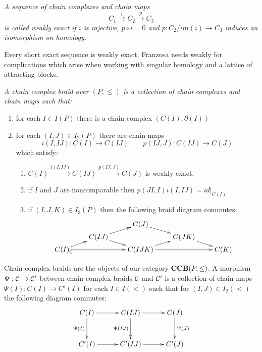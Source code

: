 \begin{defn}
{\em
A sequence of chain complexes and chain maps $$C_1\xrightarrow{i} C_2 \xrightarrow{p} C_3$$
is called {\em weakly exact} if $i$ is injective, $p\circ i = 0$ and $p:C_2/im(i)\to C_3$ induces an isomorphism on homology.
}
\end{defn}
\begin{rem}
Every short exact sequence is weakly exact.  Franzosa needs weakly for complications which arise when working with singular homology and a lattice of attracting blocks.
\end{rem}

\begin{defn}
{\em
A {\em chain complex braid} over $(P,\leq)$ is a collection of chain complexes and chain maps such that:
\begin{enumerate}
\item for each $I\in I(P)$ there is a chain complex $(C(I),\partial(I))$
\item for each $(I,J)\in I_2(P)$ there are chain maps $$i(I,IJ):C(I)\to C(IJ)\quad\quad p(IJ,J):C(IJ)\to C(J)$$ which satisfy:
\begin{enumerate}
\item $C(I)\xrightarrow{i(I,IJ)} C(IJ)\xrightarrow{p(IJ,J)} C(J)$ is weakly exact,
\item if $I$ and $J$ are noncomparable then $p(JI,I)i(I,IJ)=id|_{C(I)}$
\item if $(I,J,K)\in I_3(P)$ then the following braid diagram commutes:
\[
\xymatrixrowsep{0.03in}
\xymatrixcolsep{0.3in}
\xymatrix{
& & C(J) \ar[dr] & &  \\
& C(IJ) \ar[ur] \ar[dr] & & C(JK) \ar[dr] &  \\
C(I) \ar[ur] \ar@{_{(}->}[rr]& & C(IJK) \ar[rr] \ar[ur]& & C(K) 
}
\]
\end{enumerate}

\end{enumerate}
}
\end{defn}

Chain complex braids are the objects of our category ${\bf CCB}(P,\leq)$.  A morphism $\Psi:{\mathcal C}\to {\mathcal C}'$ between chain complex braids ${\mathcal C}$ and ${\mathcal C}'$ is a collection of chain maps $\Psi(I):C(I)\to C'(I)$ for each $I\in I(<)$ such that for $(I,J)\in I_2(<)$ the following diagram commutes:
\[
\xymatrixcolsep{0.4in}
\xymatrixrowsep{0.4in}
\xymatrix{
C(I) \ar[r] \ar@{->}[d]_{\Psi(I)} & C(IJ) \ar@{->}[d]_{\Psi(IJ)} \ar[r] & C(J) \ar@{->}[d]^{\Psi(J)}  \\
C'(I) \ar[r] & C'(IJ) \ar[r] & C'(J)
}
\] 

